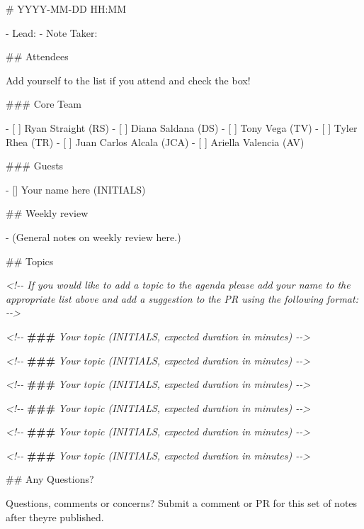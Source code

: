 \documentclass[]{tufte-book}
\newenvironment{Shaded}{}{}
\newcommand{\AlertTok}[1]{\textcolor[rgb]{1.00,0.00,0.00}{\textbf{#1}}}
\newcommand{\CommentTok}[1]{\textcolor[rgb]{0.38,0.63,0.69}{\textit{#1}}}
\newcommand{\FunctionTok}[1]{\textcolor[rgb]{0.02,0.16,0.49}{#1}}
\newcommand{\NormalTok}[1]{#1}
\newcommand{\SpecialStringTok}[1]{\textcolor[rgb]{0.73,0.40,0.53}{#1}}
\newcommand{\VariableTok}[1]{\textcolor[rgb]{0.10,0.09,0.49}{#1}}
\begin{document}
\begin{Shaded}
\begin{Highlighting}[]
\FunctionTok{\# YYYY{-}MM{-}DD HH:MM}

\SpecialStringTok{{-} }\NormalTok{Lead:}
\SpecialStringTok{{-} }\NormalTok{Note Taker: }

\FunctionTok{\#\# Attendees}

\NormalTok{Add yourself to the list if you attend and check the box!}

\FunctionTok{\#\#\# Core Team}

\SpecialStringTok{{-} }\VariableTok{[ ]}\NormalTok{ Ryan Straight (RS)}
\SpecialStringTok{{-} }\VariableTok{[ ]}\NormalTok{ Diana Saldana (DS)}
\SpecialStringTok{{-} }\VariableTok{[ ]}\NormalTok{ Tony Vega (TV)}
\SpecialStringTok{{-} }\VariableTok{[ ]}\NormalTok{ Tyler Rhea (TR)}
\SpecialStringTok{{-} }\VariableTok{[ ]}\NormalTok{ Juan Carlos Alcala (JCA)}
\SpecialStringTok{{-} }\VariableTok{[ ]}\NormalTok{ Ariella Valencia (AV)}

\FunctionTok{\#\#\# Guests}

\SpecialStringTok{{-} }\NormalTok{[] Your name here (INITIALS)}

\FunctionTok{\#\# Weekly review}

\SpecialStringTok{{-} }\NormalTok{(General notes on weekly review here.)}

\FunctionTok{\#\# Topics}

\CommentTok{\textless{}!{-}{-} If you would like to add a topic to the agenda please add}
\CommentTok{your name to the appropriate list above and add a suggestion to}
\CommentTok{the PR using the following format: {-}{-}\textgreater{}}

\CommentTok{\textless{}!{-}{-} }\AlertTok{\#\#\#}\CommentTok{ Your topic (INITIALS, expected duration in minutes) {-}{-}\textgreater{}}

\CommentTok{\textless{}!{-}{-} }\AlertTok{\#\#\#}\CommentTok{ Your topic (INITIALS, expected duration in minutes) {-}{-}\textgreater{}}

\CommentTok{\textless{}!{-}{-} }\AlertTok{\#\#\#}\CommentTok{ Your topic (INITIALS, expected duration in minutes) {-}{-}\textgreater{}}

\CommentTok{\textless{}!{-}{-} }\AlertTok{\#\#\#}\CommentTok{ Your topic (INITIALS, expected duration in minutes) {-}{-}\textgreater{}}

\CommentTok{\textless{}!{-}{-} }\AlertTok{\#\#\#}\CommentTok{ Your topic (INITIALS, expected duration in minutes) {-}{-}\textgreater{}}

\CommentTok{\textless{}!{-}{-} }\AlertTok{\#\#\#}\CommentTok{ Your topic (INITIALS, expected duration in minutes) {-}{-}\textgreater{}}

\FunctionTok{\#\# Any Questions?}

\NormalTok{Questions, comments or concerns? Submit a comment or PR for this}
\NormalTok{set of notes after they\textquotesingle{}re published.}
\end{Highlighting}
\end{Shaded}
\end{document}
